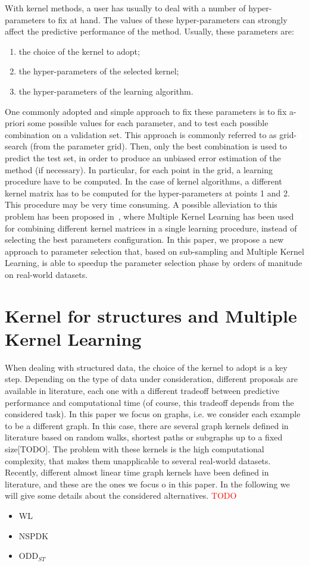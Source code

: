 \documentclass{esannV2}
\begin{document}
With kernel methods, a user has usually to deal with a number of hyper-parameters to fix at hand. The values of these hyper-parameters can strongly affect the predictive performance of the method.
Usually, these parameters are:
\begin{enumerate}
 \item the choice of the kernel to adopt;
 \item the hyper-parameters of the selected kernel;
 \item the hyper-parameters of the learning algorithm.
\end{enumerate}
One commonly adopted and simple approach to fix these parameters is to fix a-priori some possible values for each parameter, and to test each possible combination on a validation set. This approach is commonly referred to as grid-search (from the parameter grid).
Then, only the best combination is used to predict the test set, in order to produce an unbiased error estimation of the method (if necessary).
In particular, for each point in the grid, a learning procedure have to be computed. In the case of kernel algorithms, a different kernel matrix has to be computed for the hyper-parameters at points 1 and 2.
This procedure may be very time consuming.
A possible alleviation to this problem has been proposed in~\cite{Massimo2016}, where Multiple Kernel Learning has been used for combining different kernel matrices in a single learning procedure, instead of selecting the best parameters configuration.
In this paper, we propose a new approach to parameter selection that, based on sub-sampling and Multiple Kernel Learning, is able to speedup the parameter selection phase by orders of manitude on real-world datasets.
\section{Kernel for structures and Multiple Kernel Learning}
When dealing with structured data, the choice of the kernel to adopt is a key step. Depending on the type of data under consideration, different proposals are available in literature, each one with a different tradeoff between predictive performance and computational time (of course, this tradeoff depends from the considered task).
In this paper we focus on graphs, i.e. we consider each example to be a different graph.
In this case, there are several graph kernels defined in literature based on random walks, shortest paths or subgraphs up to a fixed size[TODO]. The problem with these kernels is the high computational complexity, that makes them unapplicable to several real-world datasets.
Recently, different almost linear time graph kernels have been defined in literature, and these are the ones we focus o in this paper.
In the following we will give some details about the considered alternatives.
\textcolor{red}{TODO}\\
\begin{itemize}
 \item WL
 \item NSPDK
 \item ODD$_{ST}$
\end{itemize}
\end{document}
